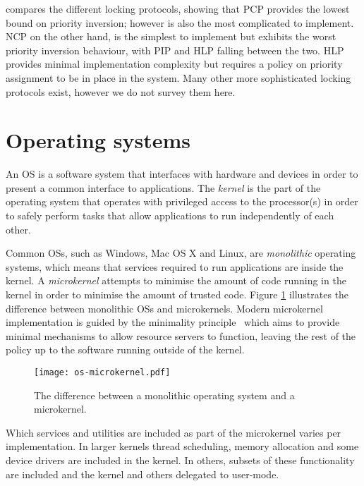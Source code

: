  compares the different locking protocols, showing that \gls{PCP} provides the lowest bound on priority inversion; however is also the most complicated to implement.
\gls{NCP} on the other hand, is the simplest to implement but exhibits the worst priority inversion behaviour, with \gls{PIP} and \gls{HLP} falling between the two.
\gls{HLP} provides minimal implementation complexity but requires a policy on priority assignment to be in place in the system.
Many other more sophisticated locking protocols exist, however we do not survey them here.


\section{Operating systems}
\label{sec:background-operating-systems}

An \gls{OS} is a software system that interfaces with hardware and devices in order to present a common interface to applications.
The \emph{kernel} is the part of the operating system that operates with privileged access to the processor(s) in order to safely perform tasks that allow applications to run independently of each other.

Common \glspl{OS}, such as Windows, Mac OS X and Linux, are \emph{monolithic} operating systems, which means that services required to run applications are inside the kernel.
A \emph{microkernel} attempts to minimise the amount of code running in the kernel in order to minimise the amount of trusted code.
Figure \ref{fig:os-microkernel} illustrates the difference between monolithic \glspl{OS} and microkernels.
Modern microkernel implementation is guided by the minimality principle~\citep{Liedtke_95} which aims to provide minimal mechanisms to allow resource servers to function, leaving the rest of the policy up to the software running outside of the kernel.

\begin{figure}[h!tb]
	\begin{center}
		\leavevmode
		\texttt{[image: os-microkernel.pdf]}
		\caption{The difference between a monolithic operating system and a microkernel.}
		\label{fig:os-microkernel}
	\end{center}
\end{figure}

Which services and utilities are included as part of the microkernel varies per implementation. In
larger kernels thread scheduling, memory allocation and some device drivers are included in the kernel.
In others, subsets of these functionality are included and the kernel and others delegated to
user-mode. 

